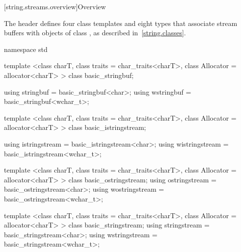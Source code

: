 [string.streams.overview]{Overview}

\pnum
The header
defines four
class templates
and eight types that associate stream buffers with objects of class
,
%
as described in~\ref{string.classes}.

%

%
%
%
%
%
%
%
%
%
%
%
%
%
%
%
%
\begin{codeblock}
namespace std {
  template <class charT, class traits = char_traits<charT>,
            class Allocator = allocator<charT> >
    class basic_stringbuf;

  using stringbuf  = basic_stringbuf<char>;
  using wstringbuf = basic_stringbuf<wchar_t>;

  template <class charT, class traits = char_traits<charT>,
            class Allocator = allocator<charT> >
    class basic_istringstream;

  using istringstream  = basic_istringstream<char>;
  using wistringstream = basic_istringstream<wchar_t>;

  template <class charT, class traits = char_traits<charT>,
            class Allocator = allocator<charT> >
    class basic_ostringstream;
  using ostringstream  = basic_ostringstream<char>;
  using wostringstream = basic_ostringstream<wchar_t>;

  template <class charT, class traits = char_traits<charT>,
            class Allocator = allocator<charT> >
    class basic_stringstream;
  using stringstream  = basic_stringstream<char>;
  using wstringstream = basic_stringstream<wchar_t>;
}
\end{codeblock}


